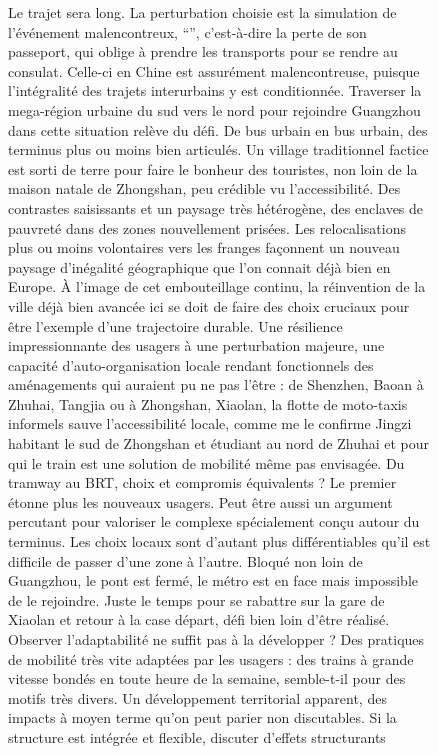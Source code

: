 \begin{figure}[h!]
\begin{mdframed}
\medskip


\end{mdframed}
\end{figure}




\begin{figure}[h!]
\begin{mdframed}
Le trajet sera long. La perturbation choisie est la simulation de l'événement malencontreux, ``'', c'est-à-dire la perte de son passeport, qui oblige à prendre les transports pour se rendre au consulat. Celle-ci en Chine est assurément malencontreuse, puisque l'intégralité des trajets interurbains y est conditionnée. Traverser la mega-région urbaine du sud vers le nord pour rejoindre Guangzhou dans cette situation relève du défi. De bus urbain en bus urbain, des terminus plus ou moins bien articulés. Un village traditionnel factice est sorti de terre pour faire le bonheur des touristes, non loin de la maison natale de Zhongshan, peu crédible vu l'accessibilité. Des contrastes saisissants et un paysage très hétérogène, des enclaves de pauvreté dans des zones nouvellement prisées. Les relocalisations plus ou moins volontaires vers les franges façonnent un nouveau paysage d'inégalité géographique que l'on connait déjà bien en Europe. À l'image de cet embouteillage continu, la réinvention de la ville déjà bien avancée ici se doit de faire des choix cruciaux pour être l'exemple d'une trajectoire durable. Une résilience impressionnante des usagers à une perturbation majeure, une capacité d'auto-organisation locale rendant fonctionnels des aménagements qui auraient pu ne pas l'être : de Shenzhen, Baoan à Zhuhai, Tangjia ou à Zhongshan, Xiaolan, la flotte de moto-taxis informels sauve l'accessibilité locale, comme me le confirme Jingzi habitant le sud de Zhongshan et étudiant au nord de Zhuhai et pour qui le train est une solution de mobilité même pas envisagée. Du tramway au BRT, choix et compromis équivalents ? Le premier étonne plus les nouveaux usagers. Peut être aussi un argument percutant pour valoriser le complexe spécialement conçu autour du terminus. Les choix locaux sont d'autant plus différentiables qu'il est difficile de passer d'une zone à l'autre. Bloqué non loin de Guangzhou, le pont est fermé, le métro est en face mais impossible de le rejoindre. Juste le temps pour se rabattre sur la gare de Xiaolan et retour à la case départ, défi bien loin d'être réalisé. Observer l'adaptabilité ne suffit pas à la développer ? Des pratiques de mobilité très vite adaptées par les usagers : des trains à grande vitesse bondés en toute heure de la semaine, semble-t-il pour des motifs très divers. Un développement territorial apparent, des impacts à moyen terme qu'on peut parier non discutables. Si la structure est intégrée et flexible, discuter d'effets structurants 
\end{mdframed}
\end{figure}

